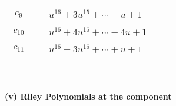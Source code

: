 \documentclass[1p]{elsarticle_modified}
\theoremstyle{definition}
\begin{document}
\begin{tabular}{m{50pt}|m{274pt}}
\hline $$\begin{aligned}c_{9}\end{aligned}$$&$\begin{aligned}
&u^{16}+3 u^{15}+\cdots- u+1
\end{aligned}$\\
\hline $$\begin{aligned}c_{10}\end{aligned}$$&$\begin{aligned}
&u^{16}+4 u^{15}+\cdots-4 u+1
\end{aligned}$\\
\hline $$\begin{aligned}c_{11}\end{aligned}$$&$\begin{aligned}
&u^{16}-3 u^{15}+\cdots+u+1
\end{aligned}$\\
\hline
\end{tabular}\\~\\
\newpage\renewcommand{\arraystretch}{1}
\flushleft \textbf{(v) Riley Polynomials at the component}\newline \\
\end{document}
